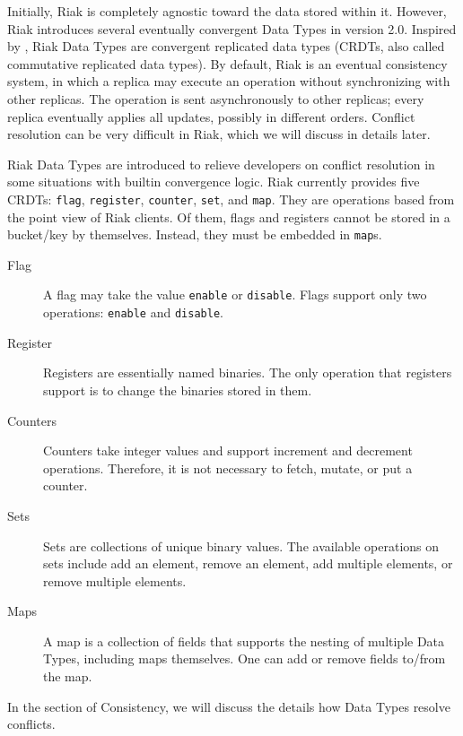 \documentclass[12pt]{book}
\begin{document}
Initially, Riak is completely agnostic toward the data stored within it. However, Riak introduces several eventually convergent Data Types in version 2.0. Inspired by \cite{CRDT2011}, Riak Data Types are convergent replicated data types (CRDTs, also called commutative replicated data types). By default, Riak is an eventual consistency system, in which a replica may execute an operation without synchronizing with other replicas. The operation is sent asynchronously to other replicas; every replica eventually applies all updates, possibly in different orders. Conflict resolution can be very difficult in Riak, which we will discuss in details later.

Riak Data Types are introduced to relieve developers on conflict resolution in some situations with builtin convergence logic. Riak currently provides five CRDTs: \texttt{flag}, \texttt{register}, \texttt{counter}, \texttt{set}, and \texttt{map}. They are operations based from the point view of Riak clients. Of them, flags and registers cannot be stored in a bucket/key by themselves. Instead, they must be embedded in \texttt{map}s.

\begin{description}
\item[Flag]
A flag may take the value \texttt{enable} or \texttt{disable}.
Flags support only two operations: \texttt{enable} and \texttt{disable}.

\item[Register]
Registers are essentially named binaries.
The only operation that registers support is to change the binaries stored in them.

\item[Counters]
Counters take integer values and support increment and decrement operations. Therefore, it is not necessary to fetch, mutate, or put a counter.

\item[Sets]
Sets are collections of unique binary values.
The available operations on sets include add an element, remove an element, add multiple elements, or remove multiple elements.

\item[Maps]
A map is a collection of fields that supports the nesting of multiple Data Types, including maps themselves. One can add or remove fields to/from the map.
\end{description}

In the section of Consistency, we will discuss the details how Data Types resolve conflicts.
\end{document}
